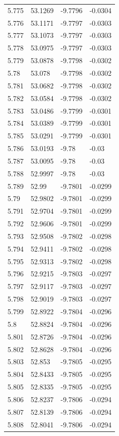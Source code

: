 \begin{tabular}{llll}
5.775 & 53.1269 & -9.7796 & -0.0304 \\
5.776 & 53.1171 & -9.7797 & -0.0303 \\
5.777 & 53.1073 & -9.7797 & -0.0303 \\
5.778 & 53.0975 & -9.7797 & -0.0303 \\
5.779 & 53.0878 & -9.7798 & -0.0302 \\
5.78 & 53.078 & -9.7798 & -0.0302 \\
5.781 & 53.0682 & -9.7798 & -0.0302 \\
5.782 & 53.0584 & -9.7798 & -0.0302 \\
5.783 & 53.0486 & -9.7799 & -0.0301 \\
5.784 & 53.0389 & -9.7799 & -0.0301 \\
5.785 & 53.0291 & -9.7799 & -0.0301 \\
5.786 & 53.0193 & -9.78 & -0.03 \\
5.787 & 53.0095 & -9.78 & -0.03 \\
5.788 & 52.9997 & -9.78 & -0.03 \\
5.789 & 52.99 & -9.7801 & -0.0299 \\
5.79 & 52.9802 & -9.7801 & -0.0299 \\
5.791 & 52.9704 & -9.7801 & -0.0299 \\
5.792 & 52.9606 & -9.7801 & -0.0299 \\
5.793 & 52.9508 & -9.7802 & -0.0298 \\
5.794 & 52.9411 & -9.7802 & -0.0298 \\
5.795 & 52.9313 & -9.7802 & -0.0298 \\
5.796 & 52.9215 & -9.7803 & -0.0297 \\
5.797 & 52.9117 & -9.7803 & -0.0297 \\
5.798 & 52.9019 & -9.7803 & -0.0297 \\
5.799 & 52.8922 & -9.7804 & -0.0296 \\
5.8 & 52.8824 & -9.7804 & -0.0296 \\
5.801 & 52.8726 & -9.7804 & -0.0296 \\
5.802 & 52.8628 & -9.7804 & -0.0296 \\
5.803 & 52.853 & -9.7805 & -0.0295 \\
5.804 & 52.8433 & -9.7805 & -0.0295 \\
5.805 & 52.8335 & -9.7805 & -0.0295 \\
5.806 & 52.8237 & -9.7806 & -0.0294 \\
5.807 & 52.8139 & -9.7806 & -0.0294 \\
5.808 & 52.8041 & -9.7806 & -0.0294 \\

\end{tabular}
